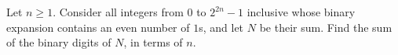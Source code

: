 Let $n\ge1$. Consider all integers from $0$ to $2^{2n}-1$ inclusive whose binary expansion contains an even number of $1$s, and let $N$ be their sum. Find the sum of the binary digits of $N$, in terms of $n$.
